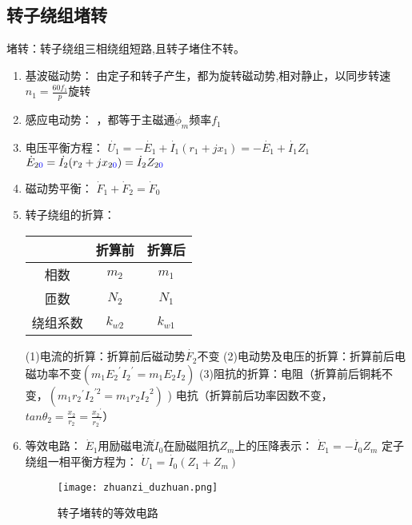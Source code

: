 \documentclass[blue]{elegantnote}
\begin{document}
\subsection{转子绕组堵转}
堵转：转子绕组三相绕组{\color{blue}短路},且转子{\color{blue}堵住不转}。
\begin{enumerate}
	\item 基波磁动势：
	\newline 由{\color{blue}定子}和{\color{blue}转子}产生，都为旋转磁动势,相对静止，{\color{blue}以同步转速$n_1=\frac{60f_1}{p}$旋转}
	\item 感应电动势：
	，都等于主磁通$\dot\phi_m$频率{\color{blue}$f_1$}
	\item 电压平衡方程：
	\newline$\dot{U_1}=-\dot{E_1}+\dot{I_1}(r_1+jx_1)=-\dot{E_1}+\dot{I_1}Z_1$
	\newline $\dot E_{2{\color{blue}0}}=\dot{I_2}(r_2+jx_{2{\color{blue}0}})=\dot I_2Z_{2{\color{blue}0}}$
	\item 磁动势平衡： $\dot F_1+\dot F_2=\dot F_0$
	\item 转子绕组的折算：\\
	\begin{table}[h]
		\centering
		\begin{tabular}{|c|c|c|}
			\hline 
			\phantom{折算前} &折算前 &折算后  \\ \hline
			相数 & $m_2$ & $m_1$ \\ \hline
			匝数 & $N_2$ & $N_1$ \\ \hline
			绕组系数 & $k_{w2}$  &  $k_{w1}$ \\ \hline
		\end{tabular}
	\end{table}
	\begin{note}
		(1)电流的折算：折算前后磁动势$\dot{F_2}$不变
		\newline \indent(2)电动势及电压的折算：折算前后电磁功率不变$(m_1{E_2}^{'}{I_2}^{'}=m_1E_2I_2)$
		\newline \indent(3)阻抗的折算：电阻（折算前后铜耗不变，$(m_1{r_2}^{'}{I_2}^{'2}=m_1r_2{I_2}^2)$ )
		\newline 电抗（折算前后功率因数不变，$tan\theta_2=\frac{x_2}{r_2}=\frac{{x_2}^{'}}{{r_2}^{'}}$）
	\end{note}
	\item 等效电路：
	\newline $\dot E_1$用励磁电流$\dot I_0$在励磁阻抗$Z_m$上的压降表示： $\dot E_1=-\dot{I_0}Z_m$
	\newline 定子绕组一相平衡方程为： $\dot U_1=\dot{I_0}(Z_1+Z_m)$
	\begin{figure}[!hbtp]
		\centering
		\texttt{[image: zhuanzi\_duzhuan.png]}
		\caption{转子堵转的等效电路\label{figur:zhuanzi_duzhuan}}
	\end{figure}
\end{enumerate}
\end{document}
